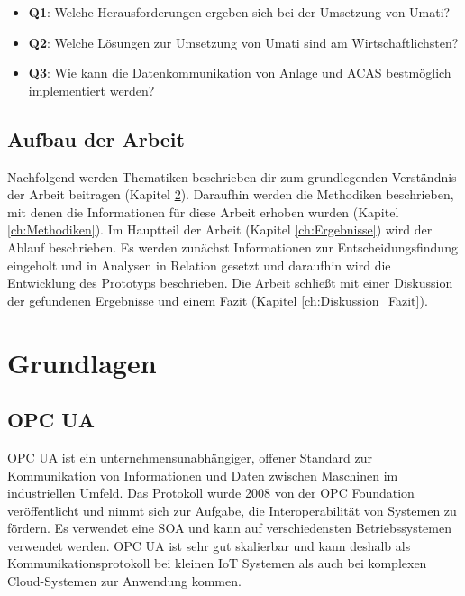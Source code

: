 \documentclass[a4paper, 12pt, oneside]{scrbook}
\begin{document}
	\begin{itemize}
		\item \textbf{Q1}: Welche Herausforderungen ergeben sich bei der Umsetzung von Umati?
		\item \textbf{Q2}: Welche Lösungen zur Umsetzung von Umati sind am Wirtschaftlichsten?
		\item \textbf{Q3}: Wie kann die Datenkommunikation von Anlage und ACAS bestmöglich implementiert werden?
	\end{itemize}
	
	\section{Aufbau der Arbeit}
	
	Nachfolgend werden Thematiken beschrieben dir zum grundlegenden Verständnis der Arbeit beitragen (Kapitel \ref{ch:Grundlagen}). Daraufhin werden die Methodiken beschrieben, mit denen die Informationen für diese Arbeit erhoben wurden (Kapitel \ref{ch:Methodiken}). Im Hauptteil der Arbeit (Kapitel \ref{ch:Ergebnisse}) wird der Ablauf beschrieben. Es werden zunächst Informationen zur Entscheidungsfindung eingeholt und in Analysen in Relation gesetzt und daraufhin wird die Entwicklung des Prototyps beschrieben. Die Arbeit schließt mit einer Diskussion der gefundenen Ergebnisse und einem Fazit (Kapitel \ref{ch:Diskussion_Fazit}).
	
	
\chapter{Grundlagen}\label{ch:Grundlagen}
	
	
	
	\section{OPC UA}
	
	 \ac{OPC UA} ist ein unternehmensunabhängiger, offener Standard zur Kommunikation von Informationen und Daten zwischen Maschinen im industriellen Umfeld. Das Protokoll wurde 2008 von der OPC Foundation veröffentlicht und nimmt sich zur Aufgabe, die Interoperabilität von Systemen zu fördern. Es verwendet eine \ac{SOA} und kann auf verschiedensten Betriebssystemen verwendet werden. OPC UA ist sehr gut skalierbar und kann deshalb als Kommunikationsprotokoll bei kleinen \ac{IoT} Systemen als auch bei komplexen Cloud-Systemen zur Anwendung kommen. 
	 
\end{document}
